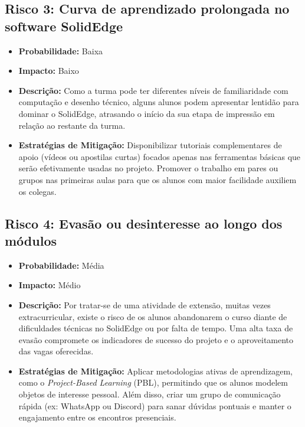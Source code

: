 \documentclass[12pt, a4paper]{article}
\begin{document}
\subsection{Risco 3: Curva de aprendizado prolongada no software SolidEdge}
\begin{itemize}
    \item \textbf{Probabilidade:} Baixa
    \item \textbf{Impacto:} Baixo
    \item \textbf{Descrição:} Como a turma pode ter diferentes níveis de familiaridade com computação e desenho técnico, alguns alunos podem apresentar lentidão para dominar o SolidEdge, atrasando o início da sua etapa de impressão em relação ao restante da turma.
    \item \textbf{Estratégias de Mitigação:} Disponibilizar tutoriais complementares de apoio (vídeos ou apostilas curtas) focados apenas nas ferramentas básicas que serão efetivamente usadas no projeto. Promover o trabalho em pares ou grupos nas primeiras aulas para que os alunos com maior facilidade auxiliem os colegas.
\end{itemize}

\subsection{Risco 4: Evasão ou desinteresse ao longo dos módulos}
\begin{itemize}
\item \textbf{Probabilidade:} Média
\item \textbf{Impacto:} Médio
\item \textbf{Descrição:} Por tratar-se de uma atividade de extensão, muitas vezes extracurricular, existe o risco de os alunos abandonarem o curso diante de dificuldades técnicas no SolidEdge ou por falta de tempo. Uma alta taxa de evasão compromete os indicadores de sucesso do projeto e o aproveitamento das vagas oferecidas.
\item \textbf{Estratégias de Mitigação:} Aplicar metodologias ativas de aprendizagem, como o \textit{Project-Based Learning} (PBL), permitindo que os alunos modelem objetos de interesse pessoal. Além disso, criar um grupo de comunicação rápida (ex: WhatsApp ou Discord) para sanar dúvidas pontuais e manter o engajamento entre os encontros presenciais.
\end{itemize}
\end{document}
